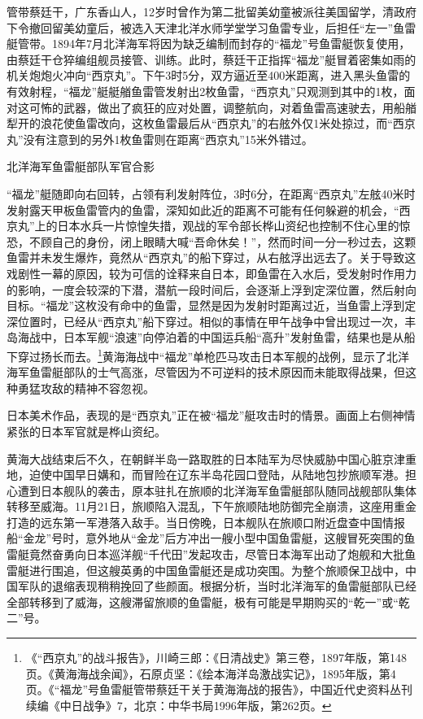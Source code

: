 \documentclass[12pt,UTF8]{ctexbook}
\begin{document}
管带蔡廷干，广东香山人，12岁时曾作为第二批留美幼童被派往美国留学，清政府下令撤回留美幼童后，被选入天津北洋水师学堂学习鱼雷专业，后担任“左一”鱼雷艇管带。1894年7月北洋海军将因为缺乏编制而封存的“福龙”号鱼雷艇恢复使用，由蔡廷干仓猝编组舰员接管、训练。此时，蔡廷干正指挥“福龙”艇冒着密集如雨的机关炮炮火冲向“西京丸”。下午3时5分，双方逼近至400米距离，进入黑头鱼雷的有效射程，“福龙”艇艇艏鱼雷管发射出2枚鱼雷，“西京丸”只观测到其中的1枚，面对这可怖的武器，做出了疯狂的应对处置，调整航向，对着鱼雷高速驶去，用船艏犁开的浪花使鱼雷改向，这枚鱼雷最后从“西京丸”的右舷外仅1米处掠过，而“西京丸”没有注意到的另外1枚鱼雷则在距离“西京丸”15米外错过。

北洋海军鱼雷艇部队军官合影

“福龙”艇随即向右回转，占领有利发射阵位，3时6分，在距离“西京丸”左舷40米时发射露天甲板鱼雷管内的鱼雷，深知如此近的距离不可能有任何躲避的机会，“西京丸”上的日本水兵一片惊惶失措，观战的军令部长桦山资纪也控制不住心里的惊恐，不顾自己的身份，闭上眼睛大喊“吾命休矣！”，然而时间一分一秒过去，这颗鱼雷并未发生爆炸，竟然从“西京丸”的船下穿过，从右舷浮出远去了。关于导致这戏剧性一幕的原因，较为可信的诠释来自日本，即鱼雷在入水后，受发射时作用力的影响，一度会较深的下潜，潜航一段时间后，会逐渐上浮到定深位置，然后射向目标。“福龙”这枚没有命中的鱼雷，显然是因为发射时距离过近，当鱼雷上浮到定深位置时，已经从“西京丸”船下穿过。相似的事情在甲午战争中曾出现过一次，丰岛海战中，日本军舰“浪速”向停泊着的中国运兵船“高升”发射鱼雷，结果也是从船下穿过扬长而去。\footnote{《“西京丸”的战斗报告》，川崎三郎：《日清战史》第三卷，1897年版，第148页。《黄海海战余闻》，石原贞坚：《绘本海洋岛激战实记》，1895年版，第4页。《“福龙”号鱼雷艇管带蔡廷干关于黄海海战的报告》，中国近代史资料丛刊续编《中日战争》7，北京：中华书局1996年版，第262页。}黄海海战中“福龙”单枪匹马攻击日本军舰的战例，显示了北洋海军鱼雷艇部队的士气高涨，尽管因为不可逆料的技术原因而未能取得战果，但这种勇猛攻敌的精神不容忽视。

日本美术作品，表现的是“西京丸”正在被“福龙”艇攻击时的情景。画面上右侧神情紧张的日本军官就是桦山资纪。

黄海大战结束后不久，在朝鲜半岛一路取胜的日本陆军为尽快威胁中国心脏京津重地，迫使中国早日媾和，而冒险在辽东半岛花园口登陆，从陆地包抄旅顺军港。担心遭到日本舰队的袭击，原本驻扎在旅顺的北洋海军鱼雷艇部队随同战舰部队集体转移至威海。11月21日，旅顺陷入混乱，下午旅顺陆地防御完全崩溃，这座用重金打造的远东第一军港落入敌手。当日傍晚，日本舰队在旅顺口附近盘查中国情报船“金龙”号时，意外地从“金龙”后方冲出一艘小型中国鱼雷艇，这艘冒死突围的鱼雷艇竟然奋勇向日本巡洋舰“千代田”发起攻击，尽管日本海军出动了炮舰和大批鱼雷艇进行围追，但这艘英勇的中国鱼雷艇还是成功突围。为整个旅顺保卫战中，中国军队的退缩表现稍稍挽回了些颜面。根据分析，当时北洋海军的鱼雷艇部队已经全部转移到了威海，这艘滞留旅顺的鱼雷艇，极有可能是早期购买的“乾一”或“乾二”号。
\end{document}
